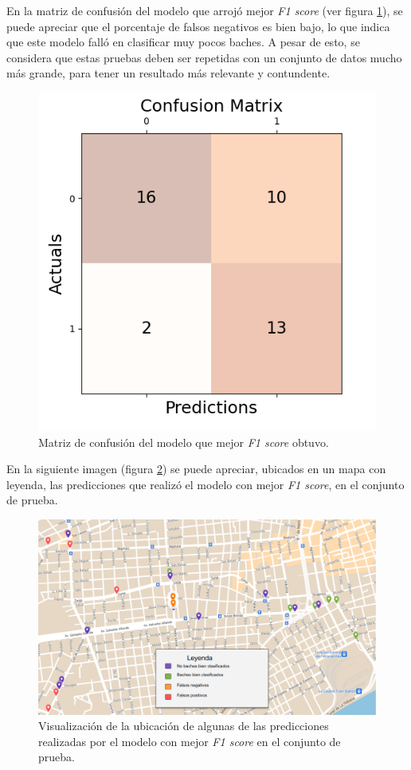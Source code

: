 	En la matriz de confusión del modelo que arrojó mejor \emph{F1 score} (ver figura \ref{fig:13}), se puede apreciar que el porcentaje de falsos
	negativos es bien bajo, lo que indica que este modelo falló en clasificar muy pocos baches. A pesar de esto, se considera que estas pruebas 
	deben ser repetidas con un conjunto de datos mucho más grande, para tener un resultado más relevante y contundente.

	\begin{figure}[htb]
		\centering
		\includegraphics[scale = 0.6]{Graphics/best_model_confusion_matrix.png}
		\caption{Matriz de confusión del modelo que mejor \emph{F1 score} obtuvo.}
		\label{fig:13}
	\end{figure}

	En la siguiente imagen (figura \ref{fig:14}) se puede apreciar, ubicados en un mapa con leyenda, las predicciones que realizó el modelo con mejor 
	\emph{F1 score}, en el conjunto de prueba.

	\newpage
	\begin{figure}[htb]
		\centering
		\includegraphics[scale = 0.4]{Graphics/map_point_predictions.png}
		\caption{Visualización de la ubicación de algunas de las predicciones realizadas por el modelo con mejor \emph{F1 score} en el conjunto de prueba.}
		\label{fig:14}
	\end{figure}

